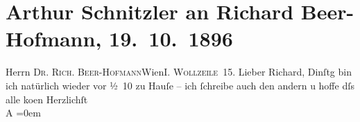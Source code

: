 

         
         \renewcommand{\erwaehntePersonen}{Personen: Richard Beer-Hofmann}
         \renewcommand{\erwaehnteOrte}{Orte: I., Innere Stadt, IX., Alsergrund, Wien, Wollzeile}
         \renewcommand{\erwaehnteWerke}{}
               \section[Arthur Schnitzler an Richard Beer-Hofmann, 19. 10. 1896]{ Arthur Schnitzler an Richard Beer-Hofmann, 19. 10. 1896}\nopagebreak{}\rehead{ }\begin{ledgroupsized}[t]{13cm}\normalsize\beginnumbering{} \toendnotes[C]{\smallbreak\pagebreak[2]} 
\pstart{}{\pb}Herrn \textsc{Dr. Rich.
                     Beer-Hofmann}\pend{}\pstart{}Wien\pend{}\pstart{}I. \textsc{Wollzeile 15}.\pend{}{\bigskip}\pstart
           \noindent{}Lieber Richard,{ }Dinſtg bin ich natürlich wieder vor ½ 10 zu Hauſe – ich
               ſchreibe auch den andern u hoffe dſs alle ko{\geminationm}en\pend
           \pstart
           Herzlichſt{\\[\baselineskip]}\spacefill\mbox{A}\pend
           \leftskip=0em{}
         
         \endnumbering{}\end{ledgroupsized}  \newcommand{\dateiname}{L00607}\newcommand{\titel}{Arthur Schnitzler an Richard Beer-Hofmann, 19. 10. 1896}\newcommand{\editorInnen}{Martin Anton Müller und Gerd-Hermann Susen}
      